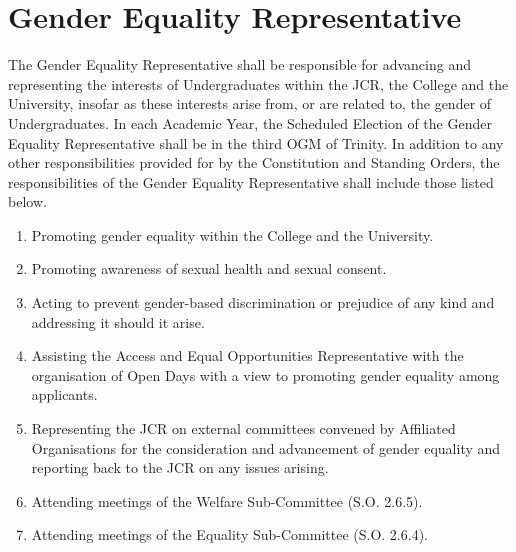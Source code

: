 \section{Gender Equality Representative}
\npara The Gender Equality Representative shall be responsible for advancing and representing the interests of Undergraduates within the JCR, the College and the University, insofar as these interests arise from, or are related to, the gender of Undergraduates.
\npara In each Academic Year, the Scheduled Election of the Gender Equality Representative shall be in the third OGM of Trinity.
\npara In addition to any other responsibilities provided for by the Constitution and Standing Orders, the responsibilities of the Gender Equality Representative shall include those listed below.
\begin{enumerate}
	\item Promoting gender equality within the College and the University.     
	\item Promoting awareness of sexual health and sexual consent.     
	\item Acting to prevent gender-based discrimination or prejudice of any kind and addressing it should it arise.     
	\item Assisting the Access and Equal Opportunities Representative with the organisation of Open Days with a view to promoting gender equality among applicants.     
	\item Representing the JCR on external committees convened by Affiliated Organisations for the consideration and advancement of gender equality and reporting back to the JCR on any issues arising.     
	\item Attending meetings of the Welfare Sub-Committee (S.O. 2.6.5).     
	\item Attending meetings of the Equality Sub-Committee (S.O. 2.6.4).
\end{enumerate}
